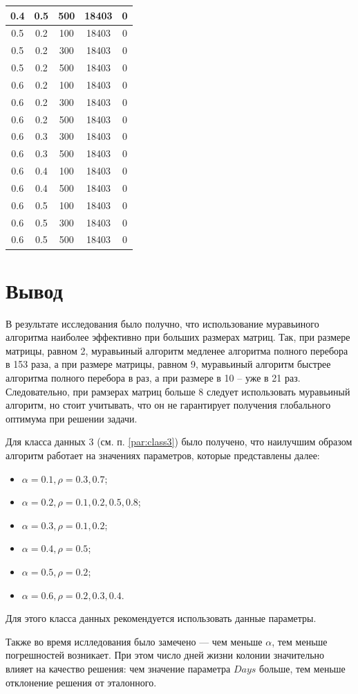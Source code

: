 \begin{center}
\begin{longtable}[c]{|c|c|c|c|c|}
		0.4 &  0.5 &  500 & 18403 &     0 \\ \hline
		0.5 &  0.2 &  100 & 18403 &     0 \\
		0.5 &  0.2 &  300 & 18403 &     0 \\
		0.5 &  0.2 &  500 & 18403 &     0 \\ \hline
		0.6 &  0.2 &  100 & 18403 &     0 \\
		0.6 &  0.2 &  300 & 18403 &     0 \\
		0.6 &  0.2 &  500 & 18403 &     0 \\ \hline
		0.6 &  0.3 &  300 & 18403 &     0 \\
		0.6 &  0.3 &  500 & 18403 &     0 \\ \hline
		0.6 &  0.4 &  100 & 18403 &     0 \\
		0.6 &  0.4 &  500 & 18403 &     0 \\ \hline
		0.6 &  0.5 &  100 & 18403 &     0 \\
		0.6 &  0.5 &  300 & 18403 &     0 \\
		0.6 &  0.5 &  500 & 18403 &     0 \\ \hline
	\end{longtable}
\end{center}

\section*{Вывод}

В результате исследования было получно, что использование муравьиного алгоритма наиболее эффективно при больших размерах матриц. Так, при размере матрицы, равном 2, муравьиный алгоритм медленее алгоритма полного перебора в 153 раза, а при размере матрицы, равном 9, муравьиный алгоритм быстрее алгоритма полного перебора в раз, а при размере в 10 -- уже в 21 раз. Следовательно, при рамзерах матриц больше 8 следует использовать муравьиный алгоритм, но стоит учитывать, что он не гарантирует получения глобального оптимума при решении задачи.

Для класса данных 3 (см. п. \ref{par:class3}) было получено, что наилучшим образом алгоритм работает на значениях параметров, которые представлены далее:
\begin{itemize}[label=---]
	\item $\alpha = 0.1, \rho = 0.3, 0.7$;
	\item $\alpha = 0.2, \rho = 0.1, 0.2, 0.5, 0.8$;
	\item $\alpha = 0.3, \rho = 0.1, 0.2$;
	\item $\alpha = 0.4, \rho = 0.5$;
	\item $\alpha = 0.5, \rho = 0.2$;
	\item $\alpha = 0.6, \rho = 0.2, 0.3, 0.4$.
\end{itemize} 
Для этого класса данных рекомендуется использовать данные параметры.

Также во время ислледования было замечено --- чем меньше $\alpha$, тем меньше погрешностей возникает. При этом число дней жизни колонии значительно влияет на качество решения: чем значение параметра $Days$ больше, тем меньше отклонение решения от эталонного.